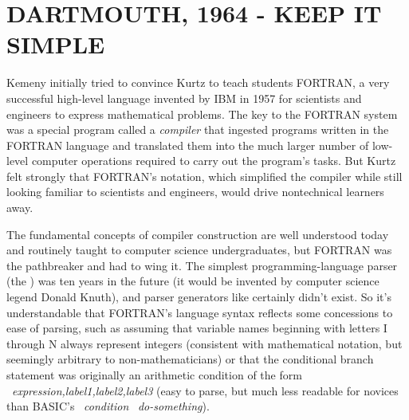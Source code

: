 
\section{DARTMOUTH, 1964 - KEEP IT SIMPLE}


Kemeny initially tried to convince Kurtz to teach students FORTRAN, a
very successful high-level language invented by IBM in 1957 for
scientists and engineers to express mathematical problems.
The key to the FORTRAN system was a special program called a
\emph{compiler} that ingested programs written in the FORTRAN language
and translated them into the much larger number of low-level
computer operations required to carry out the program's tasks.
But Kurtz felt strongly that FORTRAN's notation, which simplified
the compiler while still looking familiar to scientists
and engineers, would drive
nontechnical learners away.

\begin{tangent} 
The fundamental concepts of compiler construction are well understood
today and routinely taught to computer science 
undergraduates,
but FORTRAN was the pathbreaker and had to wing it. 
The simplest programming-language
parser (the 
) was ten years in the
future (it would be invented by computer science legend Donald Knuth),
and parser generators like  certainly didn't exist.
So it's understandable that FORTRAN's language syntax
reflects some concessions to ease of parsing, such as assuming that
variable names beginning with letters I through N always represent
integers (consistent with mathematical notation, 
but seemingly arbitrary to non-mathematicians)
or that the conditional branch statement was originally an arithmetic
condition of the form
~\emph{expression,label1,label2,label3} (easy
to parse,
but much less readable for novices than BASIC's ~\emph{condition}
~\emph{do-something}).

\end{tangent}

